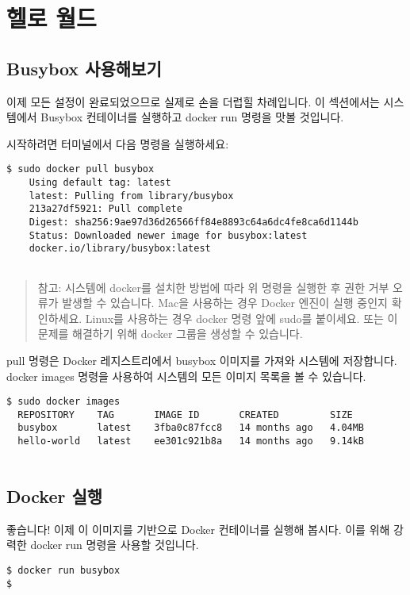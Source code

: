 \chapter{헬로 월드}
\section{Busybox 사용해보기}
이제 모든 설정이 완료되었으므로 실제로 손을 더럽힐 차례입니다. 이 섹션에서는 시스템에서 Busybox 컨테이너를 실행하고 docker run 명령을 맛볼 것입니다.

시작하려면 터미널에서 다음 명령을 실행하세요:
\begin{lstlisting}[language=Shell]
$ sudo docker pull busybox
    Using default tag: latest
    latest: Pulling from library/busybox
    213a27df5921: Pull complete 
    Digest: sha256:9ae97d36d26566ff84e8893c64a6dc4fe8ca6d1144b
    Status: Downloaded newer image for busybox:latest
    docker.io/library/busybox:latest
    
\end{lstlisting}

\begin{quote}
참고: 시스템에 docker를 설치한 방법에 따라 위 명령을 실행한 후 권한 거부 오류가 발생할 수 있습니다. Mac을 사용하는 경우 Docker 엔진이 실행 중인지 확인하세요. Linux를 사용하는 경우 docker 명령 앞에 sudo를 붙이세요. 또는 이 문제를 해결하기 위해 docker 그룹을 생성할 수 있습니다.
\end{quote}

pull 명령은 Docker 레지스트리에서 busybox 이미지를 가져와 시스템에 저장합니다. docker images 명령을 사용하여 시스템의 모든 이미지 목록을 볼 수 있습니다.
\begin{lstlisting}[language=Shell]
$ sudo docker images
  REPOSITORY    TAG       IMAGE ID       CREATED         SIZE
  busybox       latest    3fba0c87fcc8   14 months ago   4.04MB
  hello-world   latest    ee301c921b8a   14 months ago   9.14kB
    
\end{lstlisting}

\section{Docker 실행}
좋습니다! 이제 이 이미지를 기반으로 Docker 컨테이너를 실행해 봅시다. 이를 위해 강력한 docker run 명령을 사용할 것입니다.
\begin{lstlisting}[language=Shell]
$ docker run busybox
$
\end{lstlisting}

